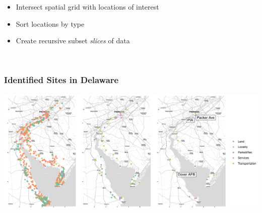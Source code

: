 \documentclass[aspectratio=169,10pt,notes]{beamer}
\begin{document}
\begin{frame}
\begin{minipage}{0.44\textwidth}
        {\footnotesize
        \begin{itemize}
            \item Intersect spatial grid with locations of interest
            \item Sort locations by type
            \item Create recursive subset \emph{slices} of data
            \begin{center}
            {\scriptsize
            
            }
            \end{center}
            
            \vfill
            
            ~
        \end{itemize}
        
        }
    \end{minipage}
\end{frame} %

\note{
    \begin{itemize}
        \item
    \end{itemize}
}

\begin{frame}
    \frametitle{Identified Sites in Delaware}
    \begin{centering}
        \includegraphics[width=0.99\linewidth]{./ch3/plots/delaware}
    \end{centering}
\end{frame} %

\note{
    \begin{itemize}
        \item
    \end{itemize}
}
\end{document}
